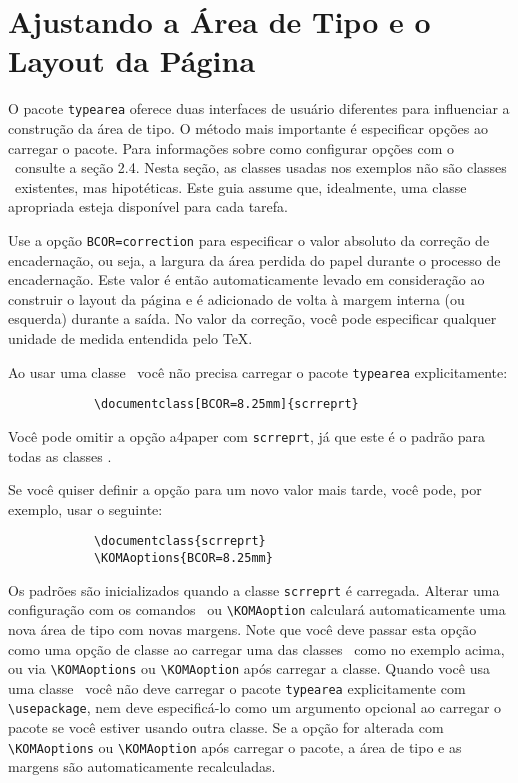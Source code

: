 \chapter{Ajustando a Área de Tipo e o Layout da Página}
O pacote \texttt{typearea} oferece duas interfaces de usuário diferentes para influenciar a construção da área de tipo. O método mais importante é especificar opções ao carregar o pacote. Para informações sobre como configurar opções com o \KOMAScript\ consulte a seção 2.4. Nesta seção, as classes usadas nos exemplos não são classes \KOMAScript\ existentes, mas hipotéticas. Este guia assume que, idealmente, uma classe apropriada esteja disponível para cada tarefa.

Use a opção \texttt{BCOR=correction} para especificar o valor absoluto da correção de encadernação, ou seja, a largura da área perdida do papel durante o processo de encadernação. Este valor é então automaticamente levado em consideração ao construir o layout da página e é adicionado de volta à margem interna (ou esquerda) durante a saída. No valor da correção, você pode especificar qualquer unidade de medida entendida pelo \TeX.

Ao usar uma classe \KOMAScript\ você não precisa carregar o pacote \texttt{typearea} explicitamente:
\begin{verbatim}
            \documentclass[BCOR=8.25mm]{scrreprt}
\end{verbatim}

Você pode omitir a opção a4paper com \texttt{scrreprt}, já que este é o padrão para todas as classes \KOMAScript.

Se você quiser definir a opção para um novo valor mais tarde, você pode, por exemplo, usar o seguinte:
\begin{verbatim}
            \documentclass{scrreprt}
            \KOMAoptions{BCOR=8.25mm}
\end{verbatim}

Os padrões são inicializados quando a classe \texttt{scrreprt} é carregada. Alterar uma configuração com os comandos \KOMAScript\ ou \verb|\KOMAoption| calculará automaticamente uma nova área de tipo com novas margens.
Note que você deve passar esta opção como uma opção de classe ao carregar uma das classes \KOMAScript\ como no exemplo acima, ou via \verb|\KOMAoptions| ou \verb|\KOMAoption| após carregar a classe. Quando você usa uma classe \KOMAScript\ você não deve carregar o pacote \texttt{typearea} explicitamente com \verb|\usepackage|, nem deve especificá-lo como um argumento opcional ao carregar o pacote se você estiver usando outra classe. Se a opção for alterada com \verb|\KOMAoptions| ou \verb|\KOMAoption| após carregar o pacote, a área de tipo e as margens são automaticamente recalculadas.

